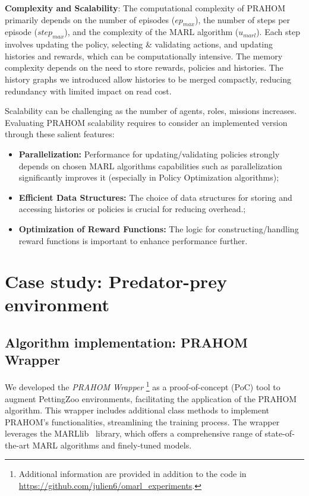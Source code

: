 \documentclass[runningheads]{llncs}
\theoremstyle{freethm}
\theoremstyle{proofoutline}
\newcounter{proof}
\begin{document}
\textbf{Complexity and Scalability}: \quad The computational complexity of PRAHOM primarily depends on the number of episodes ($ep_{max}$), the number of steps per episode ($step_{max}$), and the complexity of the MARL algorithm ($u_{marl}$). Each step involves updating the policy, selecting \& validating actions, and updating histories and rewards, which can be computationally intensive. The memory complexity depends on the need to store rewards, policies and histories. The history graphs we introduced allow histories to be merged compactly, reducing redundancy with limited impact on read cost.

Scalability can be challenging as the number of agents, roles, missions increases. Evaluating PRAHOM scalability requires to consider an implemented version through these salient features:
\begin{itemize}
    \item \textbf{Parallelization:} Performance for updating/validating policies strongly depends on chosen MARL algorithms capabilities such as parallelization significantly improves it (especially in Policy Optimization algorithms);
    \item \textbf{Efficient Data Structures:} The choice of data structures for storing and accessing histories or policies is crucial for reducing overhead.;
    \item \textbf{Optimization of Reward Functions:} The logic for constructing/handling reward functions is important to enhance performance further.
\end{itemize}

\section{Case study: Predator-prey environment}

\subsection{Algorithm implementation: PRAHOM Wrapper}

We developed the \textit{PRAHOM Wrapper}
%
\footnote{Additional information are provided in addition to the code in \url{https://github.com/julien6/omarl_experiments}.}
%
as a proof-of-concept (PoC) tool to augment PettingZoo environments, facilitating the application of the PRAHOM algorithm. This wrapper includes additional class methods to implement PRAHOM's functionalities, streamlining the training process. The wrapper leverages the MARLlib~\cite{hu2022marllib} library, which offers a comprehensive range of state-of-the-art MARL algorithms and finely-tuned models.
\end{document}
